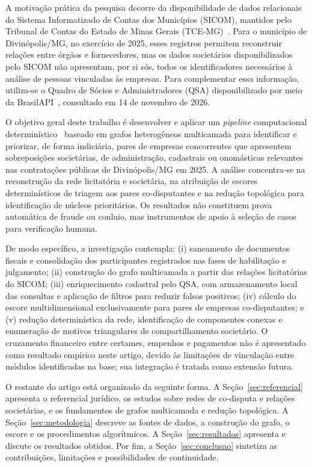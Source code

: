 A motivação prática da pesquisa decorre da disponibilidade de dados relacionais do Sistema Informatizado de Contas dos Municípios (SICOM), mantidos pelo Tribunal de Contas do Estado de Minas Gerais (TCE-MG)~\cite{tce_mg_dados_abertos,tcemg2025in01}. Para o município de Divinópolis/MG, no exercício de 2025, esses registros permitem reconstruir relações entre órgãos e fornecedores, mas os dados societários disponibilizados pelo SICOM não apresentam, por si sós, todos os identificadores necessários à análise de pessoas vinculadas às empresas. Para complementar essa informação, utiliza-se o Quadro de Sócios e Administradores (QSA) disponibilizado por meio da BrasilAPI~\cite{brasilapi2026cnpj}, consultado em 14 de novembro de 2026.

O objetivo geral deste trabalho é desenvolver e aplicar um \textit{pipeline} computacional determinístico~\cite{projeto_github} baseado em grafos heterogêneos multicamada para identificar e priorizar, de forma indiciária, pares de empresas concorrentes que apresentem sobreposições societárias, de administração, cadastrais ou onomásticas relevantes nas contratações públicas de Divinópolis/MG em 2025. A análise concentra-se na reconstrução da rede licitatória e societária, na atribuição de escores determinísticos de triagem aos pares co-disputantes e na redução topológica para identificação de núcleos prioritários. Os resultados não constituem prova automática de fraude ou conluio, mas instrumentos de apoio à seleção de casos para verificação humana.

De modo específico, a investigação contempla: (i) saneamento de documentos fiscais e consolidação dos participantes registrados nas fases de habilitação e julgamento; (ii) construção do grafo multicamada a partir das relações licitatórias do SICOM; (iii) enriquecimento cadastral pelo QSA, com armazenamento local das consultas e aplicação de filtros para reduzir falsos positivos; (iv) cálculo do escore multidimensional exclusivamente para pares de empresas co-disputantes; e (v) redução determinística da rede, identificação de componentes conexas e enumeração de motivos triangulares de compartilhamento societário. O cruzamento financeiro entre certames, empenhos e pagamentos não é apresentado como resultado empírico neste artigo, devido às limitações de vinculação entre módulos identificadas na base; sua integração é tratada como extensão futura.

O restante do artigo está organizado da seguinte forma. A Seção~\ref{sec:referencial} apresenta o referencial jurídico, os estudos sobre redes de co-disputa e relações societárias, e os fundamentos de grafos multicamada e redução topológica. A Seção~\ref{sec:metodologia} descreve as fontes de dados, a construção do grafo, o escore e os procedimentos algorítmicos. A Seção~\ref{sec:resultados} apresenta e discute os resultados obtidos. Por fim, a Seção~\ref{sec:conclusao} sintetiza as contribuições, limitações e possibilidades de continuidade.
